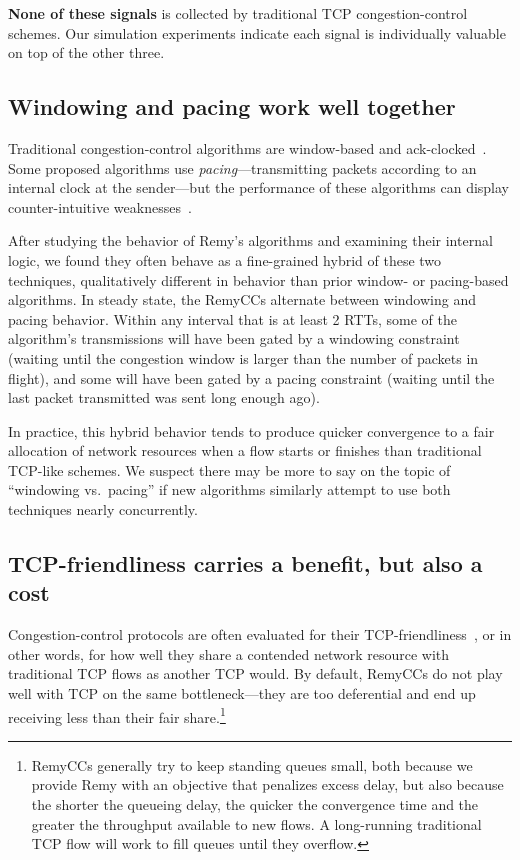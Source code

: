 \textbf{None of these signals} is collected by traditional TCP
congestion-control schemes. Our simulation experiments indicate each
signal is individually valuable on top of the other three.

\subsection{Windowing and pacing work well together}

Traditional congestion-control algorithms are window-based and
ack-clocked~\cite{Srikant}. Some proposed algorithms use
\emph{pacing}---transmitting packets according to an internal clock at
the sender---but the performance of these algorithms can display
counter-intuitive weaknesses~\cite{understandingpacing}.

After studying the behavior of Remy's algorithms and examining their
internal logic, we found they often behave as a fine-grained
hybrid of these two techniques, qualitatively different in behavior
than prior window- or pacing-based algorithms. In steady state, the
RemyCCs alternate between windowing and
pacing behavior. Within any interval that is at least 2 RTTs, some of
the algorithm's transmissions will have been gated by a windowing
constraint (waiting until the congestion window is larger than the
number of packets in flight), and some will have been gated by a
pacing constraint (waiting until the last packet transmitted was sent
long enough ago).

In practice, this hybrid behavior tends to produce quicker convergence to a
fair allocation of network resources when a flow starts or finishes
than traditional TCP-like schemes. We suspect there may be more to say
on the topic of ``windowing vs.~pacing'' if new algorithms similarly
attempt to use both techniques nearly concurrently.

\subsection{TCP-friendliness carries a benefit, but also a cost}

Congestion-control protocols are often evaluated for their
TCP-friendliness~\cite{friendlysurvey}, or in other words, for how
well they share a contended network resource with traditional TCP
flows as another TCP would.  By default, RemyCCs do not
play well with TCP on the same bottleneck---they are too deferential
and end up receiving less than their fair share.\footnote{RemyCCs
  generally try to keep standing queues small, both because we provide
  Remy with an objective that penalizes excess delay, but also because
  the shorter the queueing delay, the quicker the convergence time and
  the greater the throughput available to new flows. A long-running
  traditional TCP flow will work to fill queues until they overflow.}


